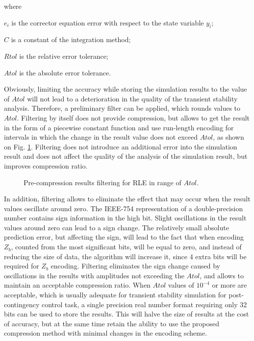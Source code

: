 \documentclass[lettersize,journal]{IEEEtran}
\begin{document}
\noindent where
\begin{description}
	\item  \(e_i\) is the corrector equation error with respect to the 
	state variable \(y_i\);
	\item  \(C\) is a constant of the integration method;
	\item  \(Rtol\) is the relative error tolerance;
	\item  \(Atol\) is the absolute error tolerance.
\end{description}

Obviously, limiting the accuracy while storing the simulation results 
to the value of \(Atol\) will not lead to a deterioration in the quality of the transient stability analysis. 
Therefore, a preliminary filter can be applied, which rounds values to \(Atol\). 
Filtering by itself does not provide compression, but allows to get the result in the form of a piecewise
constant function and use run-length encoding for intervals in which the change in the result value does not exceed \(Atol\), as shown on Fig. \ref{fig_rle}. 
Filtering does not introduce an additional error into the simulation 
result and does not affect the quality of the analysis of the simulation result, but improves compression ratio.

\begin{figure}[h]
	\centering
	\caption{Pre-compression results filtering for RLE in range of \(Atol\).}
	\label{fig_rle}
\end{figure}

In addition, filtering allows to eliminate the effect that may occur when the result values oscillate around zero. 
The IEEE-754 representation of a double-precision number contains sign information in the high bit. 
Slight oscillations in the result values around zero can lead to a sign change. The relatively 
small absolute prediction error, but affecting the sign, will lead to the fact that when encoding \(Z_b\), 
counted from the most significant bits, will be equal to zero, and instead of reducing the size of data, 
the algorithm will increase it, since 4 extra bits will be required for \(Z_b\) encoding. 
Filtering eliminates the sign change caused by oscillations in the results with amplitudes not exceeding 
the \(Atol\), and allows to maintain an acceptable compression ratio.
When \(Atol\) values of \(10^{-4}\) or more are acceptable, which is usually adequate for transient stability
simulation for post-contingency control task, a single precision real number format requiring only 32 bits 
can be used to store the results. 
This will halve the size of results at the cost of accuracy, but at the same time 
retain the ability to use the proposed compression method with minimal changes in the encoding scheme.
\end{document}

